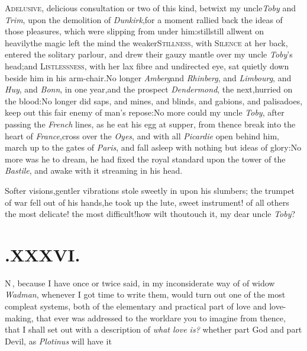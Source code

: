 \documentclass{article}
\begin{document}
\lettrine{A}{delusive}, delicious consultation or
two of this kind, betwixt my uncle\break \textit{Toby} and \textit{Trim},
upon the demolition of \textit{Dunkirk},\tsk for a moment rallied
back the ideas of those pleasures, which were slipping from under
him:\tsk still\tsk still all\break went on
heavily\tsh the magic left the mind the
weaker\tsk \textsc{Stillness}, with \textsc{Silence}
at her back, entered the solitary parlour, and drew their gauzy
mantle over my uncle \textit{Toby}’s head;\tsk\!\tsk and\break
\textsc{Listlessness}, with her lax fibre and un\-directed eye,
sat quietly down beside him in his arm-chair.\tsh No longer
\textit{Amberg}\break and \textit{Rhinberg}, and \textit{Limbourg}, and
\textit{Huy}, and \textit{Bonn}, in one year,\tsk and the prospect
\break
\textit{Dendermond}, the next,\tsk hurried on the blood:\tsk No
longer did saps, and mines, and blinds, and gabions, and
palisadoes, keep out this fair enemy of man’s
repose:\tsh No more could my uncle \textit{Toby}, after
passing the \textit{French} lines, as he eat his egg at supper, from
thence break into the heart of \textit{France},\tsk cross over the
\textit{Oyes}, and with all \textit{Picardie} open behind him, march up
to the gates of \textit{Paris}, and fall asleep with nothing but
ideas of glory:\tsh No more was he to dream, he had fixed
the royal standard upon the tower of the \textit{Bastile}, and awake
with it streaming in his head.

\tsh Softer visions,\tsk gentler vibrations stole
sweetly in upon his slumbers;\break
\tsk the trumpet of war fell out of
his hands,\tsk he took up the lute, sweet instrument! of all
others the most delicate! the most difficult!\tsh how wilt
thou\break touch it, my dear uncle \textit{Toby}?

\vfill{}\eject
\null\smallskip
\section{.\enspace XXXVI.}

\lettrine{N}{\,}, because I have once or twice
said, in my inconsiderate way of \break
{}
of
widow \textit{Wadman}, whenever I got time to write them, would turn
out one of the most compleat systems, both of the elementary and
practical part of love and love-making, that ever was addressed to
the world\tsh are you to imagine from thence, that I shall
set out with a description of \textit{what love is?} whether part God
and part Devil, as \textit{Plotinus} will have\break
it\tsh
\end{document}
